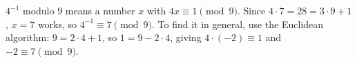 $4^{-1}$ modulo $9$ means a number $x$ with $4x\equiv1\pmod9$. Since $4\cdot7=28=3\cdot9+1$, $x=7$ works, so $4^{-1}\equiv\boxed{7}\pmod9$. To find it in general, use the Euclidean algorithm: $9=2\cdot4+1$, so $1=9-2\cdot4$, giving $4\cdot(-2)\equiv1$ and $-2\equiv7\pmod9$.
